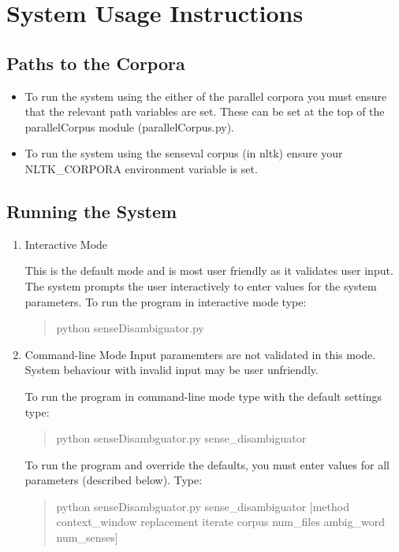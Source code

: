 \documentclass[a4wide,10pt]{article}
\begin{document}
\section{System Usage Instructions}

\subsection{Paths to the Corpora}

\begin{itemize}
\item To run the system using the either of the parallel corpora
        you must ensure that the relevant path variables are set.
        These can be set at the top of the parallelCorpus module
        (parallelCorpus.py).  
\item To run the system using the senseval corpus (in nltk) ensure
        your NLTK\_CORPORA environment variable is set.
\end{itemize}

\subsection{Running the System}

\begin{enumerate}
\item Interactive Mode

        This is the default mode and is most user friendly as it validates
        user input. The system prompts the user interactively to
        enter values for the system parameters. To run the program in
        interactive mode type:

\begin{quote}
                 python senseDisambiguator.py
\end{quote}

\item Command-line Mode
        Input paramemters are not validated in this mode. System behaviour
        with invalid input may be user unfriendly.

        To run the program in command-line mode type with the default
        settings type:

\begin{quote}
                python senseDisambguator.py sense\_disambiguator
\end{quote}


        To run the program and override the defaults, you must enter values
        for all parameters (described below). Type:

\begin{quote}
                python senseDisambguator.py sense\_disambiguator [method
                        context\_window replacement iterate corpus num\_files
                        ambig\_word num\_senses]
\end{quote}

\end{enumerate}
\end{document}
